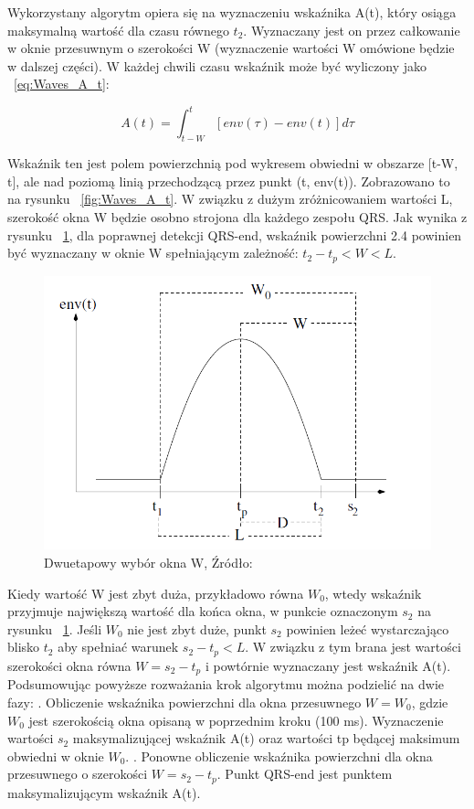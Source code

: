 \begin{description}
Wykorzystany algorytm opiera się na wyznaczeniu wskaźnika A(t), który osiąga maksymalną wartość dla czasu równego $t_2$. Wyznaczany jest on przez całkowanie w oknie przesuwnym o szerokości W (wyznaczenie wartości W omówione będzie w dalszej części). W każdej chwili czasu wskaźnik może być wyliczony jako ~\ref{eq:Waves_A_t}:

\begin{equation} \label{eq:Waves_A_t}
A(t)=\int_{t-W}^t [env(\tau)-env(t)]d\tau
\end{equation}

Wskaźnik ten jest polem powierzchnią pod wykresem obwiedni w obszarze [t-W, t], ale nad poziomą linią przechodzącą przez punkt (t, env(t)). Zobrazowano to na rysunku ~\ref{fig:Waves_A_t}.
W związku z dużym zróżnicowaniem wartości L, szerokość okna W będzie osobno strojona dla każdego zespołu QRS. Jak wynika z rysunku ~\ref{fig:Waves_W0}, dla poprawnej detekcji QRS-end, wskaźnik powierzchni 2.4 powinien być wyznaczany w oknie W spełniającym zależność: $t_2 - t_p < W < L$.

\begin{figure}[h]
\centering
\includegraphics[width=\textwidth,keepaspectratio] {Waves/img/W0.png}
\caption{Dwuetapowy wybór okna W, Źródło: \cite{Waves_QRSAlg}}
\label{fig:Waves_W0}
\end{figure}
Kiedy wartość W jest zbyt duża, przykładowo równa $W_0$, wtedy wskaźnik przyjmuje największą wartość dla końca okna, w punkcie oznaczonym $s_2$ na rysunku ~\ref{fig:Waves_W0}. Jeśli $W_0$  nie jest zbyt duże, punkt $s_2$ powinien leżeć wystarczająco blisko $t_2$ aby spełniać warunek $s_2 - t_p < L$. W związku z tym brana jest wartości szerokości okna równa $W = s_2 - t_p$ i powtórnie wyznaczany jest wskaźnik A(t).
Podsumowując powyższe rozważania krok algorytmu można podzielić na dwie fazy: . Obliczenie wskaźnika powierzchni dla okna przesuwnego $W=W_0$, gdzie $W_0$ jest szerokością okna opisaną w poprzednim kroku (100 ms). Wyznaczenie wartości $s_2$ maksymalizującej wskaźnik A(t) oraz wartości tp będącej maksimum obwiedni w oknie $W_0$. . Ponowne obliczenie wskaźnika powierzchni dla okna przesuwnego o szerokości $W= s_2 - t_p$. Punkt QRS-end jest punktem maksymalizującym wskaźnik A(t).
\end{description}

